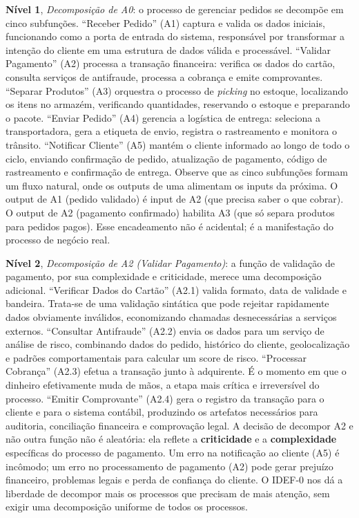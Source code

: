 \textbf{Nível 1}, \emph{Decomposição de A0}: o processo de gerenciar pedidos
se decompõe em cinco subfunções. ``Receber Pedido'' (A1) captura e valida os dados
iniciais, funcionando como a porta de entrada do sistema, responsável por transformar a intenção
do cliente em uma estrutura de dados válida e processável. ``Validar Pagamento''
(A2) processa a transação financeira: verifica os dados do cartão, consulta
serviços de antifraude, processa a cobrança e emite comprovantes. ``Separar
Produtos'' (A3) orquestra o processo de \emph{picking} no estoque, localizando os
itens no armazém, verificando quantidades, reservando o estoque e preparando o pacote.
``Enviar Pedido'' (A4) gerencia a logística de entrega: seleciona a
transportadora, gera a etiqueta de envio, registra o rastreamento e monitora o
trânsito. ``Notificar Cliente'' (A5) mantém o cliente informado ao longo de todo
o ciclo, enviando confirmação de pedido, atualização de pagamento, código de
rastreamento e confirmação de entrega. Observe que as cinco subfunções formam
um fluxo natural, onde os outputs de uma alimentam os inputs da próxima. O output
de A1 (pedido validado) é input de A2 (que precisa saber o que cobrar). O output
de A2 (pagamento confirmado) habilita A3 (que só separa produtos para pedidos
pagos). Esse encadeamento não é acidental; é a manifestação do processo de
negócio real.

\textbf{Nível 2}, \emph{Decomposição de A2 (Validar Pagamento)}: a função de
validação de pagamento, por sua complexidade e criticidade, merece uma decomposição
adicional. ``Verificar Dados do Cartão'' (A2.1) valida formato, data de validade e
bandeira. Trata-se de uma validação sintática que pode rejeitar rapidamente dados
obviamente inválidos, economizando chamadas desnecessárias a serviços externos.
``Consultar Antifraude'' (A2.2) envia os dados para um serviço de análise
de risco, combinando dados do pedido, histórico do cliente, geolocalização e
padrões comportamentais para calcular um score de risco. ``Processar Cobrança''
(A2.3) efetua a transação junto à adquirente. É o momento em que o dinheiro
efetivamente muda de mãos, a etapa mais crítica e irreversível do processo.
``Emitir Comprovante'' (A2.4) gera o registro da transação para o cliente e para
o sistema contábil, produzindo os artefatos necessários para auditoria, conciliação
financeira e comprovação legal. A decisão de decompor A2 e não outra função não
é aleatória: ela reflete a \textbf{criticidade} e a \textbf{complexidade}
específicas do processo de pagamento. Um erro na notificação ao cliente (A5) é
incômodo; um erro no processamento de pagamento (A2) pode gerar prejuízo
financeiro, problemas legais e perda de confiança do cliente. O IDEF-0 nos dá a
liberdade de decompor mais os processos que precisam de mais atenção, sem exigir
uma decomposição uniforme de todos os processos.

